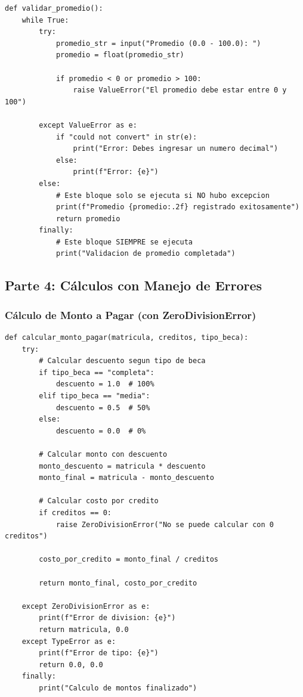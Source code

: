 \documentclass[12pt,a4paper]{article}
\begin{document}
\begin{lstlisting}[caption=Uso de else en try-except]
def validar_promedio():
    while True:
        try:
            promedio_str = input("Promedio (0.0 - 100.0): ")
            promedio = float(promedio_str)
            
            if promedio < 0 or promedio > 100:
                raise ValueError("El promedio debe estar entre 0 y 100")
                
        except ValueError as e:
            if "could not convert" in str(e):
                print("Error: Debes ingresar un numero decimal")
            else:
                print(f"Error: {e}")
        else:
            # Este bloque solo se ejecuta si NO hubo excepcion
            print(f"Promedio {promedio:.2f} registrado exitosamente")
            return promedio
        finally:
            # Este bloque SIEMPRE se ejecuta
            print("Validacion de promedio completada")
\end{lstlisting}

\subsection{Parte 4: Cálculos con Manejo de Errores}

\subsubsection{Cálculo de Monto a Pagar (con ZeroDivisionError)}

\begin{lstlisting}[caption=Manejo de division entre cero]
def calcular_monto_pagar(matricula, creditos, tipo_beca):
    try:
        # Calcular descuento segun tipo de beca
        if tipo_beca == "completa":
            descuento = 1.0  # 100%
        elif tipo_beca == "media":
            descuento = 0.5  # 50%
        else:
            descuento = 0.0  # 0%
        
        # Calcular monto con descuento
        monto_descuento = matricula * descuento
        monto_final = matricula - monto_descuento
        
        # Calcular costo por credito
        if creditos == 0:
            raise ZeroDivisionError("No se puede calcular con 0 creditos")
        
        costo_por_credito = monto_final / creditos
        
        return monto_final, costo_por_credito
        
    except ZeroDivisionError as e:
        print(f"Error de division: {e}")
        return matricula, 0.0
    except TypeError as e:
        print(f"Error de tipo: {e}")
        return 0.0, 0.0
    finally:
        print("Calculo de montos finalizado")
\end{lstlisting}
\end{document}
